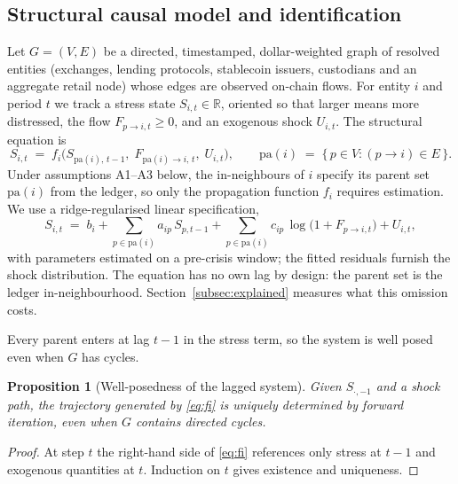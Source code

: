 \documentclass[referee,pdflatex,sn-mathphys-ay]{sn-jnl}
\theoremstyle{thmstyleone}%
\newtheorem{proposition}[theorem]{Proposition}%
\theoremstyle{thmstyletwo}%
\theoremstyle{thmstylethree}%
\newcommand{\pa}{\mathrm{pa}}
\begin{document}
\subsection{Structural causal model and identification}
\label{subsec:scm}
Let $G=(V,E)$ be a directed, timestamped, dollar-weighted graph of resolved entities
(exchanges, lending protocols, stablecoin issuers, custodians and an aggregate retail node)
whose edges are observed on-chain flows. For entity $i$ and period $t$ we track a stress
state $S_{i,t}\in\mathbb{R}$, oriented so that larger means more distressed, the flow
$F_{p\to i,t}\ge0$, and an exogenous shock $U_{i,t}$. The structural equation is
\begin{equation}
\label{eq:scm}
S_{i,t} \;=\; f_i\!\Big(S_{\pa(i),\,t-1},\; F_{\pa(i)\to i,\,t},\; U_{i,t}\Big),
\qquad
\pa(i) \;=\; \{\,p\in V : (p\to i)\in E\,\}.
\end{equation}
Under assumptions A1--A3 below, the in-neighbours of $i$ specify its parent set $\pa(i)$
from the ledger, so only the propagation function $f_i$ requires estimation. We use a
ridge-regularised linear specification,
\begin{equation}
\label{eq:fi}
S_{i,t} \;=\; b_i + \sum_{p\in\pa(i)} a_{ip}\,S_{p,t-1}
            + \sum_{p\in\pa(i)} c_{ip}\,\log\!\big(1+F_{p\to i,t}\big)
            + U_{i,t},
\end{equation}
with parameters estimated on a pre-crisis window; the fitted residuals furnish the shock
distribution. The equation has no own lag by design: the parent set is the ledger in-neighbourhood.
Section~\ref{subsec:explained} measures what this omission costs.

Every parent enters at lag $t\!-\!1$ in the stress term, so the system is well posed even
when $G$ has cycles.

\begin{proposition}[Well-posedness of the lagged system]
\label{prop:wellposed}
Given $S_{\cdot,-1}$ and a shock path, the trajectory generated by \eqref{eq:fi} is
uniquely determined by forward iteration, even when $G$ contains directed cycles.
\end{proposition}
\begin{proof}
At step $t$ the right-hand side of \eqref{eq:fi} references only stress at $t\!-\!1$ and
exogenous quantities at $t$. Induction on $t$ gives existence and uniqueness.
\end{proof}
\end{document}
